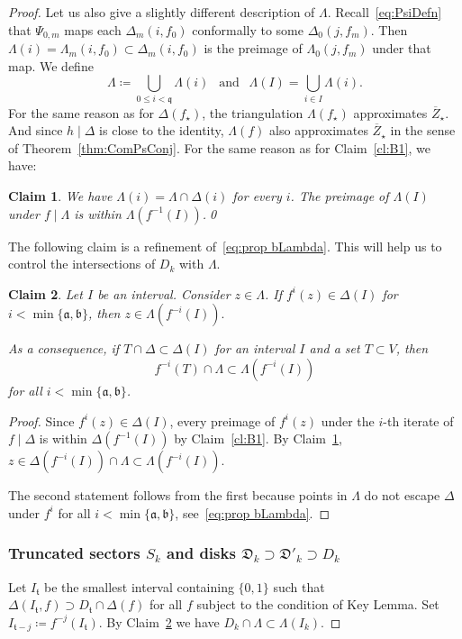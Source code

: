 \documentclass[]{amsart}
\renewcommand{\sp}{{\ \ }}
\newcommand{\bDelta}{{\mathbb{\Delta}}}
\newcommand{\bLambda}{{\mathbb{\Lambda}}}
\newcommand{\str}{{\star}}
\renewcommand{\aa}{{\mathfrak{a}}}
\newcommand{\bb}{{\mathfrak{b}}}
\renewcommand{\qq}{\mathfrak{q}}
\renewcommand{\tt}{\mathfrak{t}}
\newtheorem{claim}{Claim}
\theoremstyle{remark}
\numberwithin{equation}{section}
\theoremstyle{definition}
\begin{document}
\begin{proof}
Let us also give a slightly different description of $\bLambda$.    Recall~\eqref{eq:PsiDefn} that $\Psi_{0,m}$ maps each $\Delta_m(i,f_{0})$ conformally to some $\Delta_0(j,f_{m})$. Then $\Lambda(i)=\Lambda_m(i,f_{0})\subset \Delta_m(i,f_{0})$ is the preimage of $\Lambda_0(j,f_{m})$ under that map. We define \[\bLambda \coloneqq \bigcup_{0\le i< \qq} \Lambda(i) \sp\text{ and }\sp \Lambda(I)=\bigcup_{i\in I} \Lambda(i).\] For the same reason as for $\bDelta(f_\str)$, the triangulation $\bLambda(f_\str)$ approximates $\overline Z_\str$. And since $h\mid \bDelta$ is close to the identity, $\bLambda(f)$ also approximates $\overline Z_\str$ in the sense of Theorem~\ref{thm:ComPsConj}. For the same reason as for Claim~\ref{cl:B1}, we have:
\begin{claim}
\label{cl:B2} We have $\Lambda(i)=\bLambda\cap \Delta(i)$ for every $i$. The preimage of $\Lambda(I)$ under $f\mid \bLambda$ is within $\Lambda(f^{-1}(I))$.\qed
\end{claim}    



The following claim is a refinement of~\eqref{eq:prop bLambda}. This will help us to control the intersections of $D_k$ with $\bLambda$.

\begin{claim}
\label{cl:B3} Let $I$ be an interval. Consider $z\in \bLambda$. If $f^i(z)\in \Delta(I)$ for $i<\min\{\aa, \bb\}$, then $z\in \Lambda(f^{-i}(I)).$


As a consequence, if $T\cap \bDelta\subset \Delta(I)$ for an interval $I$ and a set $T\subset V$,  then \[f^{-i}(T)\cap \bLambda \subset \Lambda(f^{-i}(I))\]
for all $i<\min\{\aa, \bb\}$.
\end{claim}
\begin{proof}
Since $f^i(z)\in \Delta(I)$, every preimage of $f^i(z)$ under the $i$-th iterate of $f\mid \bDelta$ is within $\Delta(f^{-1}(I))$ by Claim~\ref{cl:B1}. By Claim~\ref{cl:B2}, $z\in\Delta(f^{-i}(I))\cap \bLambda \subset\Lambda(f^{-i}(I))$.

The second statement follows from the first because points in $\bLambda$ do not escape $\bDelta$ under $f^i$ for all $i<\min\{\aa, \bb\}$, see~\eqref{eq:prop bLambda}.
\end{proof}






\subsubsection{Truncated sectors $S_k$ and disks $\mathfrak D_k\supset \mathfrak D'_k\supset D_k$}
\label{sss:wideD_j}
Let $I_{\tt}$ be the smallest interval containing $\{0,1\}$ such that $\Delta(I_{\tt},f)\supset D_{\tt}\cap \bDelta(f)$ for all $f$ subject to the condition of Key Lemma. Set $I_{\tt-j}\coloneqq f^{-j}(I_{\tt})$. By Claim~\ref{cl:B3} we have $D_k\cap \bLambda\subset \Lambda(I_k)$. 


\end{proof}
\end{document}

